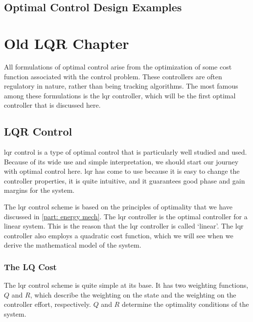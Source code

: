 \section{Optimal Control Design Examples}

\newpage
\printendnotes



\chapter{Old LQR Chapter}\label{chap:linear quadratic}

All formulations of optimal control arise from the optimization of some cost function associated with the control problem. These controllers are often regulatory in nature, rather than being tracking algorithms. The most famous among these formulations is the \gls{lqr} controller, which will be the first optimal controller that is discussed here.

\section{LQR Control}
\Gls{lqr} control is a type of optimal control that is particularly well studied and used. Because of its wide use and simple interpretation, we should start our journey with optimal control here. \Gls{lqr} has come to use because it is easy to change the controller properties, it is quite intuitive, and it guarantees good phase and gain margins for the system. 

The \gls{lqr} control scheme is based on the principles of optimality that we have discussed in \autoref{part: energy mech}. The \gls{lqr} controller is the optimal controller for a linear system. This is the reason that the \gls{lqr} controller is called `linear'. The \gls{lqr} controller also employs a quadratic cost function, which we will see when we derive the mathematical model of the system.

\subsection{The LQ Cost}
The \gls{lqr} control scheme is quite simple at its base. It has two weighting functions, $Q$ and $R$, which describe the weighting on the state and the weighting on the controller effort, respectively. $Q$ and $R$ determine the optimality conditions of the system.

